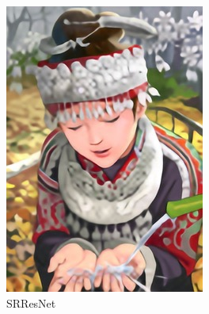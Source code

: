 \documentclass[a4paper]{book}
\begin{document}
\begin{figure}[t]
\begin{subfigure}{.24\linewidth}
        \includegraphics[width=\linewidth]{images/comic_SRResNet-MSE.jpg}
        \caption{SRResNet}
        \label{fig:srgan_srresnet}
    \end{subfigure}
    \begin{subfigure}{.24\linewidth}

\end{subfigure}
\end{figure}
\end{document}
